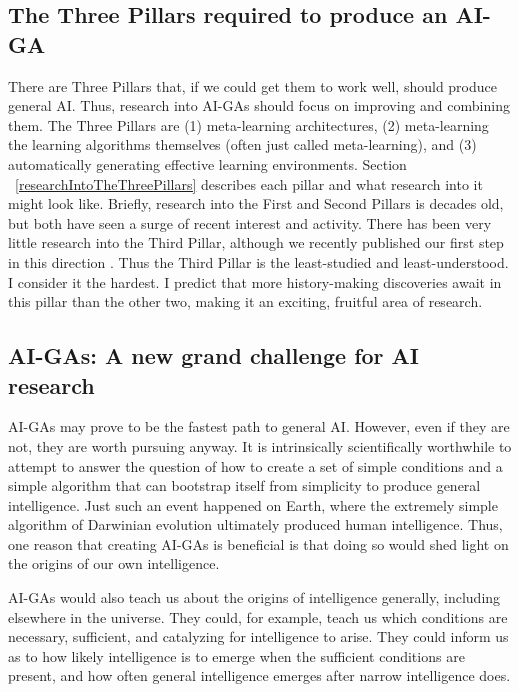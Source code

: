 \documentclass{article}
\begin{document}
\subsection{The Three Pillars required to produce an AI-GA}

There are Three Pillars that, if we could get them to work well, should produce general AI. Thus, research into AI-GAs should focus on improving and combining them. The Three Pillars are (1) meta-learning architectures, (2) meta-learning the learning algorithms themselves (often just called meta-learning), and (3) automatically generating effective learning environments. Section ~\ref{researchIntoTheThreePillars} describes each pillar and what research into it might look like. Briefly, research into the First and Second Pillars is decades old, but both have seen a surge of recent interest and activity. There has been very little research into the Third Pillar, although we recently published our first step in this direction \cite{wang2019paired}. Thus the Third Pillar is the least-studied and least-understood. I consider it the hardest. I predict that more history-making discoveries await in this pillar than the other two, making it an exciting, fruitful area of research. 

\subsection{AI-GAs: A new grand challenge for AI research}
\label{AI-GAIsAGrandChallenge}

AI-GAs may prove to be the fastest path to general AI. However, even if they are not, they are worth pursuing anyway. It is intrinsically scientifically worthwhile to attempt to answer the question of how to create a set of simple conditions and a simple algorithm that can bootstrap itself from simplicity to produce general intelligence. Just such an event happened on Earth, where the extremely simple algorithm of Darwinian evolution ultimately produced human intelligence. Thus, one reason that creating AI-GAs is beneficial is that doing so would shed light on the origins of our own intelligence. 


AI-GAs would also teach us about the origins of intelligence generally, including elsewhere in the universe. They could, for example, teach us which conditions are necessary, sufficient, and catalyzing for intelligence to arise. They could inform us as to how likely intelligence is to emerge when the sufficient conditions are present, and how often general intelligence emerges after narrow intelligence does. 
\end{document}
